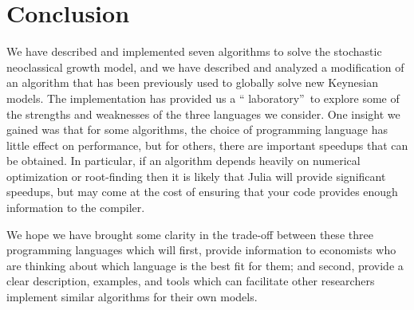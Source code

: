 
\section{Conclusion}

We have described and implemented seven algorithms to solve the stochastic
neoclassical growth model, and we have described and analyzed a modification of
an algorithm that has been previously used to globally solve new Keynesian
models. The implementation has provided us a \textquotedblleft
laboratory\textquotedblright \ to explore some of the strengths and weaknesses
of the three languages we consider. One insight we gained was that for some
algorithms, the choice of programming language has little effect on
performance, but for others, there are important speedups that can be obtained.
In particular, if an algorithm depends heavily on numerical optimization or
root-finding then it is likely that Julia will provide significant speedups,
but may come at the cost of ensuring that your code provides enough information
to the compiler.

We hope we have brought some clarity in the trade-off between these three
programming languages which will first, provide information to economists who
are thinking about which language is the best fit for them; and second, provide
a clear description, examples, and tools which can facilitate other researchers
implement similar algorithms for their own models.
